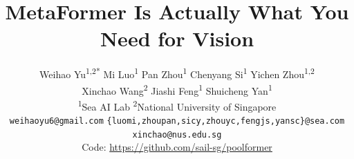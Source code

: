 \documentclass[10pt,twocolumn,letterpaper]{article}
\begin{document}
\title{MetaFormer Is Actually What You Need for Vision}


\author{
Weihao Yu\textsuperscript{1,2*} 
\quad Mi Luo\textsuperscript{1}
\quad Pan Zhou\textsuperscript{1}
\quad Chenyang Si\textsuperscript{1}
\quad Yichen Zhou\textsuperscript{1,2}
\\
\quad Xinchao Wang\textsuperscript{2}
\quad Jiashi Feng\textsuperscript{1}
\quad Shuicheng Yan\textsuperscript{1}
\\
\textsuperscript{1}{Sea AI Lab}
\quad \textsuperscript{2}{National University of Singapore}
\\
\small{\texttt{weihaoyu6@gmail.com} \quad \texttt{\{luomi,zhoupan,sicy,zhouyc,fengjs,yansc\}@sea.com} \quad \texttt{xinchao@nus.edu.sg}}
\\
\small{Code: \url{https://github.com/sail-sg/poolformer}}
}
\end{document}
